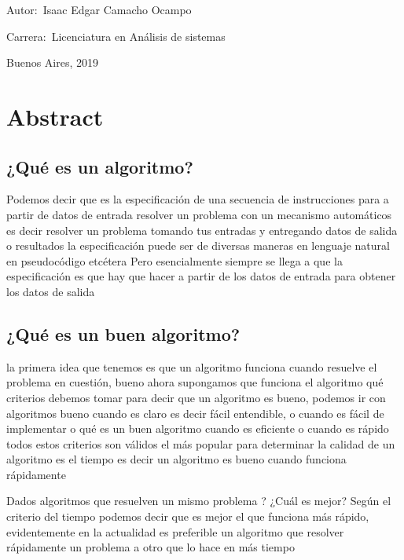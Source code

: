 \documentclass[12pt]{book}
\begin{document}
\noindent Autor:\,	Isaac Edgar Camacho Ocampo
 
\noindent Carrera:\,	Licenciatura en An\'alisis de sistemas

\vspace{1cm}

\vspace{1cm}

\noindent Buenos Aires, 2019

\newpage


\tableofcontents
\chapter*{Abstract} %
\section{¿Qué es un algoritmo?}
Podemos decir que es la especificación de una secuencia de instrucciones para a partir de datos de entrada resolver un problema con un mecanismo automáticos es decir resolver un problema tomando tus entradas y entregando datos de salida o resultados la especificación puede ser de diversas maneras en lenguaje natural en pseudocódigo etcétera
Pero esencialmente siempre se llega a que la especificación es que hay que hacer a partir de los datos de entrada para obtener los datos de salida

\section{¿Qué es un buen algoritmo?}
la primera idea que tenemos es que un algoritmo funciona cuando resuelve el problema en cuestión, bueno ahora supongamos que funciona el algoritmo qué criterios debemos tomar para decir que un algoritmo es bueno, podemos ir con algoritmos bueno cuando es claro es decir fácil entendible, o cuando es fácil de implementar o qué es un buen algoritmo cuando es eficiente o cuando es rápido todos estos criterios son válidos el más popular para determinar la calidad de un algoritmo es el tiempo es decir un algoritmo es bueno cuando funciona rápidamente

Dados algoritmos que resuelven un mismo problema ? ¿Cuál es mejor?
Según el criterio del tiempo podemos decir que es mejor el que funciona más rápido, evidentemente en la actualidad es preferible un algoritmo que resolver rápidamente un problema a otro que lo hace en más tiempo
\end{document}
